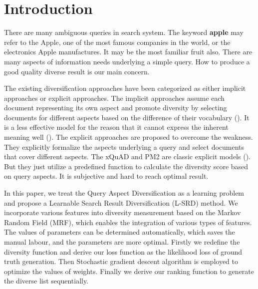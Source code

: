 \documentclass[review]{elsarticle}
\newcommand\revised[1]{{\color{black} #1}}
\begin{document}
\section{Introduction}
There are many ambiguous queries in search system. The keyword \textbf{apple} may refer to the Apple, one of the most famous companies in the world, or the electronics Apple manufactures. It may be the most familiar fruit also. There are many aspects of information needs underlying a simple query. How to produce a good quality diverse result is our main concern.


\revised{
	The existing diversification approaches have been categorized as either implicit approaches or explicit approaches. The implicit approaches assume each document representing its own aspect and promote diversity by selecting documents for different aspects based on the difference of their vocabulary (\cite{carbonell1998use}). It is a less effective model for the reason that it cannot express the inherent meaning well (\cite{agrawal2009diversifying,zhai2003beyond}). 
	The explicit approaches are proposed to overcome the weakness. They explicitly formalize the aspects underlying a query and select documents that cover different aspects. The xQuAD and PM2 are classic explicit models (\cite{santos2010exploiting,dang2012diversity}).
	But they just utilize a predefined function to calculate the diversity score based on query aspects. It is subjective and hard to reach optimal result.}


In this paper, we treat the Query Aspect Diversification as a learning problem and propose a Learnable Search Result Diversification (L-SRD) method. We incorporate various features into diversity measurement based on the Markov Random Field (MRF), which enables the integration of various types of features. The values of parameters can be determined automatically, which saves the manual labour, and the parameters are more optimal. Firstly we redefine the diversity function and derive our loss function as the likelihood loss of ground truth generation. Then Stochastic gradient descent algorithm is employed to optimize the values of weights. Finally we derive our ranking function to generate the diverse list sequentially.

\end{document}
